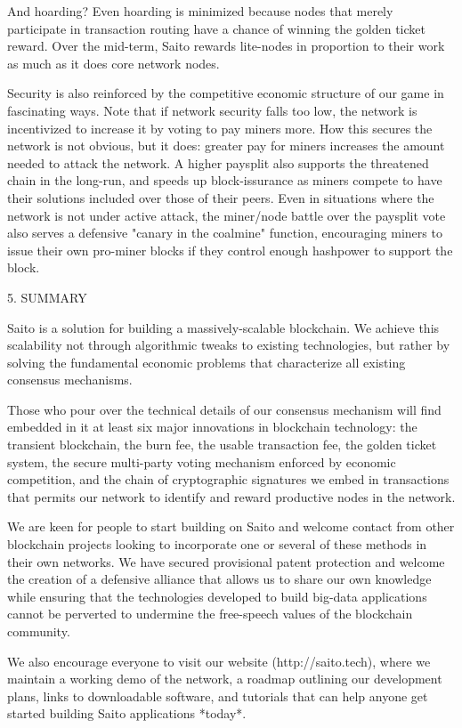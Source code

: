 \documentclass[11.5pt, oneside]{article}   	%
\begin{document}
\begin{multicols}{2}
And hoarding? Even hoarding is minimized because nodes that merely participate in transaction routing have a chance of winning the golden ticket reward. Over the mid-term, Saito rewards lite-nodes in proportion to their work as much as it does core network nodes.

Security is also reinforced by the competitive economic structure of our game in fascinating ways. Note that if network security falls too low, the network is incentivized to increase it by voting to pay miners more. How this secures the network is not obvious, but it does: greater pay for miners increases the amount needed to attack the network. A higher paysplit also supports the threatened chain in the long-run, and speeds up block-issurance as miners compete to have their solutions included over those of their peers. Even in situations where the network is not under active attack, the miner/node battle over the paysplit vote also serves a defensive "canary in the coalmine" function, encouraging miners to issue their own pro-miner blocks if they control enough hashpower to support the block.

5. SUMMARY

Saito is a solution for building a massively-scalable blockchain. We achieve this scalability not through algorithmic tweaks to existing technologies, but rather by solving the fundamental economic problems that characterize all existing consensus mechanisms.

Those who pour over the technical details of our consensus mechanism will find embedded in it at least six major innovations in blockchain technology: the transient blockchain, the burn fee, the usable transaction fee, the golden ticket system, the secure multi-party voting mechanism enforced by economic competition, and the chain of cryptographic signatures we embed in transactions that permits our network to identify and reward productive nodes in the network.  

We are keen for people to start building on Saito and welcome contact from other blockchain projects looking to incorporate one or several of these methods in their own networks. We have secured provisional patent protection and welcome the creation of a defensive alliance that allows us to share our own knowledge while ensuring that the technologies developed to build big-data applications cannot be perverted to undermine the free-speech values of the blockchain community.

We also encourage everyone to visit our website (http://saito.tech), where we maintain a working demo of the network, a roadmap outlining our development plans, links to downloadable software, and tutorials that can help anyone get started building Saito applications *today*. 

\end{multicols} 
\end{document}
